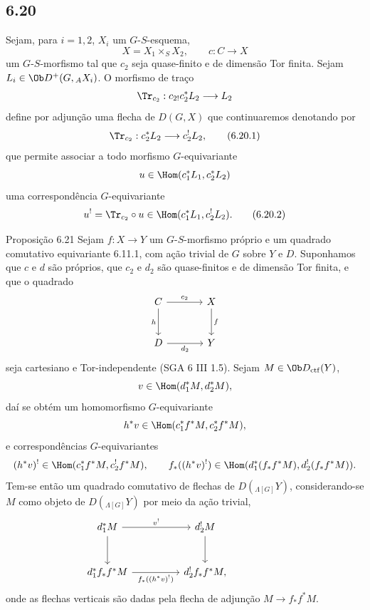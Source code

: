\subsection*{6.20}
Sejam, para $i=1,2$, $X_i$ um $G$-$S$-esquema,
\[
X=X_1\times_SX_2,\qquad c:C\to X
\]
um $G$-$S$-morfismo tal que $c_2$ seja quase-finito e de dimensão Tor finita. Sejam $L_i\in\Ob D^+(G,{}_AX_i)$. O morfismo de traço
\[
\Tr_{c_2}:c_{2!}c_2^*L_2\longrightarrow L_2
\]
define por adjunção uma flecha de $D(G,X)$ que continuaremos denotando por
\begin{equation}
\Tr_{c_2}:c_2^*L_2\longrightarrow c_2^!L_2,
\tag{6.20.1}
\end{equation}
que permite associar a todo morfismo $G$-equivariante
\[
u\in\Hom(c_1^*L_1,c_2^*L_2)
\]
uma correspondência $G$-equivariante
\begin{equation}
u^! = \Tr_{c_2}\circ u\in\Hom(c_1^*L_1,c_2^!L_2).
\tag{6.20.2}
\end{equation}

\begin{statement}{Proposição 6.21}
Sejam $f:X\to Y$ um $G$-$S$-morfismo próprio e um quadrado comutativo equivariante 6.11.1, com ação trivial de $G$ sobre $Y$ e $D$. Suponhamos que $c$ e $d$ são próprios, que $c_2$ e $d_2$ são quase-finitos e de dimensão Tor finita, e que o quadrado
\[
\begin{tikzcd}[column sep=large,row sep=large]
C \arrow[r,"c_2"] \arrow[d,"h"'] & X \arrow[d,"f"]\\
D \arrow[r,"d_2"'] & Y
\end{tikzcd}
\]
seja cartesiano e Tor-independente (SGA 6 III 1.5). Sejam $M\in\Ob D_{\mathrm{ctf}}(Y)$,
\[
v\in\Hom(d_1^*M,d_2^*M),
\]
daí se obtém um homomorfismo $G$-equivariante
\[
h^*v\in\Hom(c_1^*f^*M,c_2^*f^*M),
\]
e correspondências $G$-equivariantes
\[
(h^*v)^!\in\Hom(c_1^*f^*M,c_2^!f^*M),
\qquad
f_*((h^*v)^!)\in\Hom(d_1^*(f_*f^*M),d_2^!(f_*f^*M)).
\]
Tem-se então um quadrado comutativo de flechas de $D({}_{\Lambda[G]}Y)$, considerando-se $M$ como objeto de $D({}_{\Lambda[G]}Y)$ por meio da ação trivial,
\[
\begin{tikzcd}[column sep=huge,row sep=large]
d_1^*M \arrow[r,"v^!"] \arrow[d] & d_2^!M \arrow[d] & {}\\
d_1^*f_*f^*M \arrow[r,"f_*((h^*v)^!)"'] & d_2^!f_*f^*M,
\end{tikzcd}
\]
onde as flechas verticais são dadas pela flecha de adjunção $M\to f_*f^*M$.
\end{statement}

